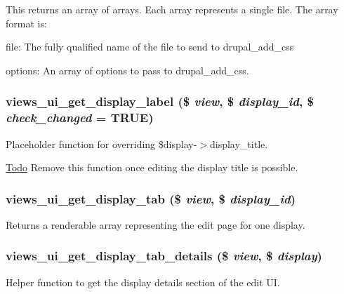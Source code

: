 This returns an array of arrays. Each array represents a single file. The array format is:
\begin{DoxyItemize}
\item file: The fully qualified name of the file to send to drupal\_\-add\_\-css
\item options: An array of options to pass to drupal\_\-add\_\-css. 
\end{DoxyItemize}\hypertarget{admin_8inc_a20b56808cc1c748e9a5d95b0753367b2}{
\subsubsection[{views\_\-ui\_\-get\_\-display\_\-label}]{\setlength{\rightskip}{0pt plus 5cm}views\_\-ui\_\-get\_\-display\_\-label (\$ {\em view}, \/  \$ {\em display\_\-id}, \/  \$ {\em check\_\-changed} = {\ttfamily TRUE})}}
\label{admin_8inc_a20b56808cc1c748e9a5d95b0753367b2}
Placeholder function for overriding \$display-\/$>$display\_\-title.

\begin{Desc}
\item[\hyperlink{todo__todo000079}{Todo}]Remove this function once editing the display title is possible. \end{Desc}
\hypertarget{admin_8inc_a260d67b28a279ec95f4222eca0137bb1}{
\subsubsection[{views\_\-ui\_\-get\_\-display\_\-tab}]{\setlength{\rightskip}{0pt plus 5cm}views\_\-ui\_\-get\_\-display\_\-tab (\$ {\em view}, \/  \$ {\em display\_\-id})}}
\label{admin_8inc_a260d67b28a279ec95f4222eca0137bb1}
Returns a renderable array representing the edit page for one display. \hypertarget{admin_8inc_ac85eb125b7c9a2a81bd2b5a0578dc587}{
\subsubsection[{views\_\-ui\_\-get\_\-display\_\-tab\_\-details}]{\setlength{\rightskip}{0pt plus 5cm}views\_\-ui\_\-get\_\-display\_\-tab\_\-details (\$ {\em view}, \/  \$ {\em display})}}
\label{admin_8inc_ac85eb125b7c9a2a81bd2b5a0578dc587}
Helper function to get the display details section of the edit UI.


